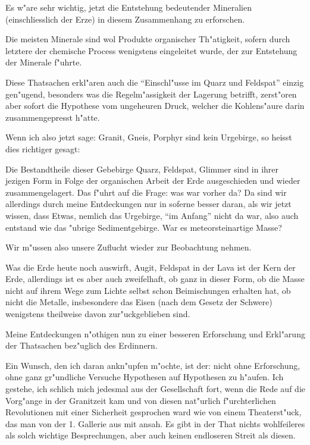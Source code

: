 \documentclass[a4paper, 11pt, oneside, german]{article}
\begin{document}
Es w"are sehr wichtig, jetzt die Entstehung bedeutender Mineralien (einschliesslich der Erze) in diesem Zusammenhang zu erforschen.

Die meisten Minerale sind wol Produkte organischer Th"atigkeit, sofern durch letztere der chemische Process wenigstens eingeleitet wurde, der zur Entstehung der Minerale f"uhrte.

Diese Thatsachen erkl"aren auch die "`Einschl"usse im Quarz und Feldspat"' einzig gen"ugend, besonders was die Regelm"assigkeit der Lagerung betrifft, zerst"oren aber sofort die Hypothese vom ungeheuren Druck, welcher die Kohlens"aure darin zusammengepresst h"atte.

Wenn ich also jetzt sage: Granit, Gneis, Porphyr sind kein Urgebirge, so heisst dies richtiger gesagt:

Die Bestandtheile dieser Gebebirge Quarz, Feldspat, Glimmer sind in ihrer jezigen Form in Folge der organischen Arbeit der Erde ausgeschieden und wieder zusammengelagert. Das f"uhrt auf die Frage: was war vorher da? Da sind wir allerdings durch meine Entdeckungen nur in soferne besser daran, als wir jetzt wissen, dass Etwas, nemlich das Urgebirge, "`im Anfang"' nicht da war, also auch entstand wie das "ubrige Sedimentgebirge. War es meteorsteinartige Masse?

Wir m"ussen also unsere Zuflucht wieder zur Beobachtung nehmen.

Was die Erde heute noch auswirft, Augit, Feldspat in der Lava ist der Kern der Erde, allerdings ist es aber auch zweifelhaft, ob ganz in dieser Form, ob die Masse nicht auf ihrem Wege zum Lichte selbst schon Beimischungen erhalten hat, ob nicht die Metalle, insbesondere das Eisen (nach dem Gesetz der Schwere) wenigstens theilweise davon zur"uckgeblieben sind.

Meine Entdeckungen n"othigen nun zu einer besseren Erforschung und Erkl"arung der Thatsachen bez"uglich des Erdinnern.

Ein Wunsch, den ich daran ankn"upfen m"ochte, ist der: nicht ohne Erforschung, ohne ganz gr"undliche Versuche Hypothesen auf Hypothesen zu h"aufen. Ich gestehe, ich schlich mich jedesmal aus der Gesellschaft fort, wenn die Rede auf die Vorg"ange in der Granitzeit kam und von diesen nat"urlich f"urchterlichen Revolutionen mit einer Sicherheit gesprochen ward wie von einem Theaterst"uck, das man von der 1. Gallerie aus mit ansah. Es gibt in der That nichts wohlfeileres als solch wichtige Besprechungen, aber auch keinen endloseren Streit als diesen.
\end{document}
